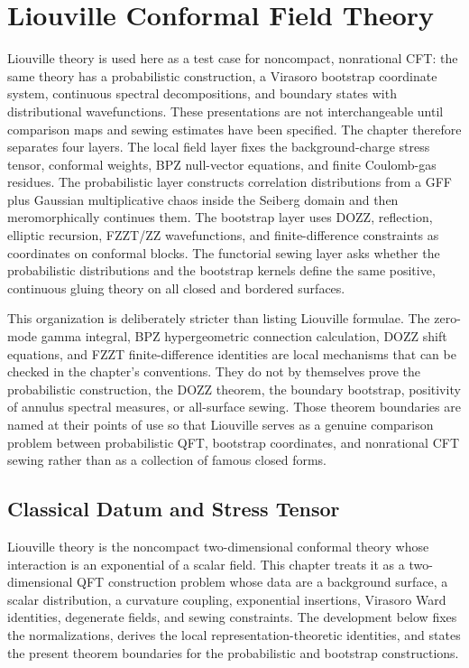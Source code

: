 \chapter{Liouville Conformal Field Theory}
\label{ch:liouville-cft}
\ConventionsEuclideanCFT

Liouville theory is used here as a test case for noncompact, nonrational CFT:
the same theory has a probabilistic construction, a Virasoro bootstrap
coordinate system, continuous spectral decompositions, and boundary states
with distributional wavefunctions.  These presentations are not interchangeable
until comparison maps and sewing estimates have been specified.  The chapter
therefore separates four layers.  The local field layer fixes the
background-charge stress tensor, conformal weights, BPZ null-vector equations,
and finite Coulomb-gas residues.  The probabilistic layer constructs
correlation distributions from a GFF plus Gaussian multiplicative chaos inside
the Seiberg domain and then meromorphically continues them.  The bootstrap
layer uses DOZZ, reflection, elliptic recursion, FZZT/ZZ wavefunctions, and
finite-difference constraints as coordinates on conformal blocks.  The
functorial sewing layer asks whether the probabilistic distributions and the
bootstrap kernels define the same positive, continuous gluing theory on all
closed and bordered surfaces.

This organization is deliberately stricter than listing Liouville formulae.
The zero-mode gamma integral, BPZ hypergeometric connection calculation, DOZZ
shift equations, and FZZT finite-difference identities are local mechanisms
that can be checked in the chapter's conventions.  They do not by themselves
prove the probabilistic construction, the DOZZ theorem, the boundary
bootstrap, positivity of annulus spectral measures, or all-surface sewing.
Those theorem boundaries are named at their points of use so that Liouville
serves as a genuine comparison problem between probabilistic QFT, bootstrap
coordinates, and nonrational CFT sewing rather than as a collection of famous
closed forms.

\section{Classical Datum and Stress Tensor}

Liouville theory is the noncompact two-dimensional conformal theory whose
interaction is an exponential of a scalar field.  This chapter treats it as a
two-dimensional QFT construction problem whose data are a background surface,
a scalar distribution, a curvature coupling, exponential insertions, Virasoro
Ward identities, degenerate fields, and sewing constraints.  The development
below fixes the normalizations, derives the local representation-theoretic
identities, and states the present theorem boundaries for the probabilistic
and bootstrap constructions.

